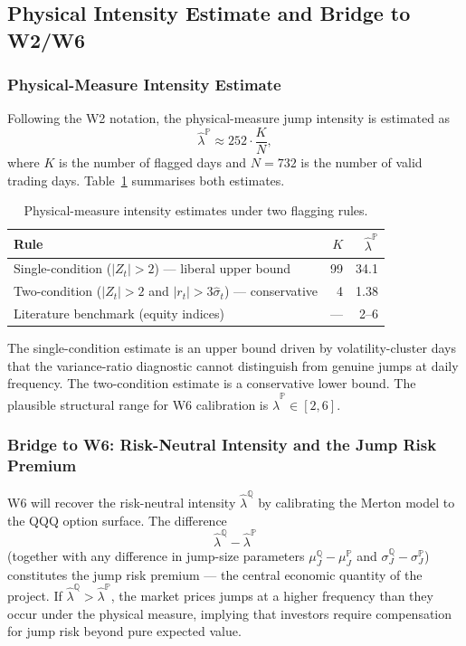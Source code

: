 \documentclass[12pt]{article}
\begin{document}
\subsection*{Physical Intensity Estimate and Bridge to W2/W6}

\subsubsection*{Physical-Measure Intensity Estimate}

Following the W2 notation, the physical-measure jump intensity is estimated as
\[
\hat{\lambda}^{\mathbb{P}} \approx 252 \cdot \frac{K}{N},
\]
where $K$ is the number of flagged days and $N=732$ is the number of valid trading days. Table~\ref{tab:intensity} summarises both estimates.

\begin{table}[H]
\centering
\caption{Physical-measure intensity estimates under two flagging rules.}
\label{tab:intensity}
\begin{tabular}{lrr}
\toprule
Rule & $K$ & $\hat{\lambda}^{\mathbb{P}}$ \\
\midrule
Single-condition ($|Z_t|>2$) --- liberal upper bound & 99 & 34.1 \\
Two-condition ($|Z_t|>2$ and $|r_t|>3\hat{\sigma}_t$) --- conservative & 4 & 1.38 \\
Literature benchmark (equity indices) & --- & 2--6 \\
\bottomrule
\end{tabular}
\end{table}

The single-condition estimate is an upper bound driven by volatility-cluster days that the variance-ratio diagnostic cannot distinguish from genuine jumps at daily frequency. The two-condition estimate is a conservative lower bound. The plausible structural range for W6 calibration is $\hat{\lambda}^{\mathbb{P}}\in[2,6]$.

\subsubsection*{Bridge to W6: Risk-Neutral Intensity and the Jump Risk Premium}

W6 will recover the risk-neutral intensity $\hat{\lambda}^{\mathbb{Q}}$ by calibrating the Merton model to the QQQ option surface. The difference
\[
\hat{\lambda}^{\mathbb{Q}}-\hat{\lambda}^{\mathbb{P}}
\]
(together with any difference in jump-size parameters
$\mu_J^{\mathbb{Q}}-\mu_J^{\mathbb{P}}$ and
$\sigma_J^{\mathbb{Q}}-\sigma_J^{\mathbb{P}}$) constitutes the jump risk premium --- the central economic quantity of the project. If $\hat{\lambda}^{\mathbb{Q}}>\hat{\lambda}^{\mathbb{P}}$, the market prices jumps at a higher frequency than they occur under the physical measure, implying that investors require compensation for jump risk beyond pure expected value.
\end{document}
